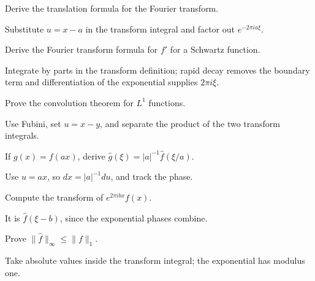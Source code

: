 \begin{problem}\label{prob:iii11-problem-02}
Derive the translation formula for the Fourier transform.
\end{problem}
\begin{solution}
Substitute \(u=x-a\) in the transform integral and factor out
\(e^{-2\pi ia\xi}\).
\end{solution}

\begin{problem}\label{prob:iii11-problem-03}
Derive the Fourier transform formula for \(f'\) for a Schwartz function.
\end{problem}
\begin{solution}
Integrate by parts in the transform definition; rapid decay removes the
boundary term and differentiation of the exponential supplies \(2\pi i\xi\).
\end{solution}

\begin{problem}\label{prob:iii11-problem-04}
Prove the convolution theorem for \(L^1\) functions.
\end{problem}
\begin{solution}
Use Fubini, set \(u=x-y\), and separate the product of the two transform
integrals.
\end{solution}

\begin{problem}[Scaling]\label{prob:iii11-problem-05}
If \(g(x)=f(ax)\), derive \(\widehat g(\xi)=|a|^{-1}\widehat f(\xi/a)\).
\end{problem}
\begin{solution}
Use \(u=ax\), so \(dx=|a|^{-1}du\), and track the phase.
\end{solution}

\begin{problem}[Modulation]\label{prob:iii11-problem-06}
Compute the transform of \(e^{2\pi ibx}f(x)\).
\end{problem}
\begin{solution}
It is \(\widehat f(\xi-b)\), since the exponential phases combine.
\end{solution}

\begin{problem}[\(L^1\) bound]\label{prob:iii11-problem-07}
Prove \(\|\widehat f\|_\infty\le\|f\|_1\).
\end{problem}
\begin{solution}
Take absolute values inside the transform integral; the exponential has
modulus one.
\end{solution}

